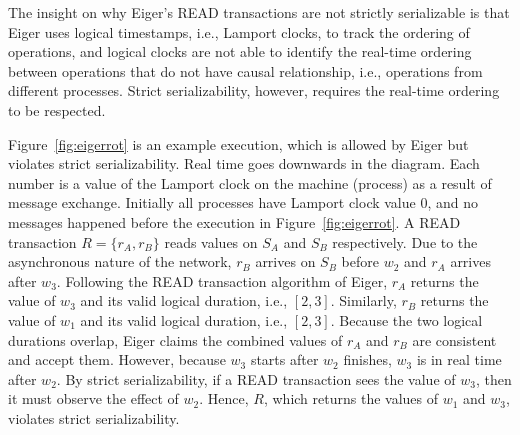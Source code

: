 The insight on why Eiger's \textsc{READ} transactions are not strictly serializable is that Eiger uses logical timestamps, i.e., Lamport clocks, to track the ordering of operations, and logical clocks are not able to identify the real-time ordering between operations that do not have causal relationship, i.e., operations from different processes. Strict serializability, however, requires the real-time ordering to be respected.

Figure~\ref{fig:eigerrot} is an example execution, which is allowed by Eiger but violates strict serializability. 
Real time goes downwards in the diagram. Each number is a value of the Lamport clock on the machine (process) as a result of message exchange. Initially all processes have Lamport clock value $0$, and no messages happened before the execution in Figure~\ref{fig:eigerrot}. A \textsc{READ} transaction $R=\{r_A, r_B\}$ reads values on $S_A$ and $S_B$ respectively. Due to the asynchronous nature of the network, $r_B$ arrives on $S_B$ before $w_2$ and $r_A$ arrives after $w_3$. Following the \textsc{READ} transaction algorithm of Eiger, $r_A$ returns the value of $w_3$ and its valid logical duration, i.e., $[2,3]$. Similarly, $r_B$ returns the value of $w_1$ and its valid logical duration, i.e., $[2,3]$. Because the two logical durations overlap, Eiger claims the combined values of $r_A$ and $r_B$ are consistent and accept them. However, because $w_3$ starts after $w_2$ finishes, $w_3$ is in real time after $w_2$. By strict serializability, if a \textsc{READ} transaction sees the value of $w_3$, then it must observe the effect of $w_2$. Hence, $R$, which returns the values of $w_1$ and $w_3$, violates strict serializability.
